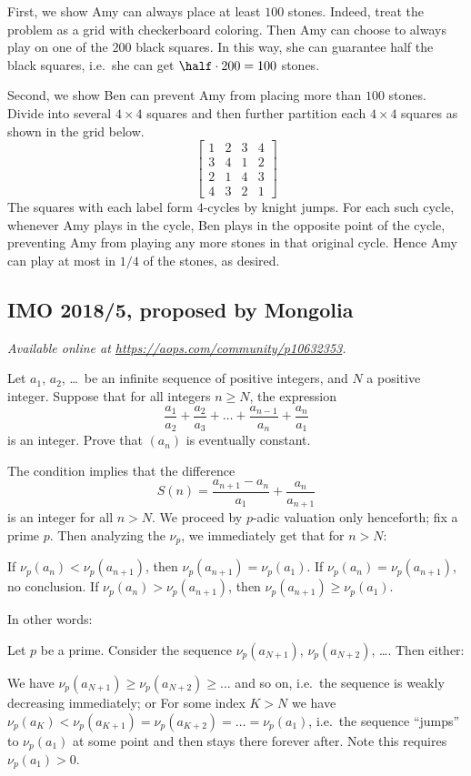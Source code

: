 \documentclass[11pt]{scrartcl}
\begin{document}
First, we show Amy can always place at least $100$ stones.
Indeed, treat the problem as a grid with checkerboard coloring.
Then Amy can choose to always play on one of the $200$ black squares.
In this way, she can guarantee half the black squares,
i.e.\ she can get $\half \cdot 200 = 100$ stones.

Second, we show Ben can prevent Amy from placing more than $100$ stones.
Divide into several $4 \times 4$ squares and then further partition
each $4 \times 4$ squares as shown in the grid below.
\[
  \left[
  \begin{array}{cccc}
    1 & 2 & 3 & 4 \\
    3 & 4 & 1 & 2 \\
    2 & 1 & 4 & 3 \\
    4 & 3 & 2 & 1
  \end{array}
  \right]
\]
The squares with each label form $4$-cycles by knight jumps.
For each such cycle, whenever Amy plays in the cycle,
Ben plays in the opposite point of the cycle,
preventing Amy from playing any more stones in that original cycle.
Hence Amy can play at most in $1/4$ of the stones, as desired.
\pagebreak

\subsection{IMO 2018/5, proposed by Mongolia}
\textsl{Available online at \url{https://aops.com/community/p10632353}.}
\begin{mdframed}[style=mdpurplebox,frametitle={Problem statement}]
Let $a_1$, $a_2$, \dots\ be an infinite sequence of positive integers,
and $N$ a positive integer.
Suppose that for all integers $n \ge N$, the expression
\[ \frac{a_1}{a_2} + \frac{a_2}{a_3} + \dots
  + \frac{a_{n-1}}{a_n} + \frac{a_n}{a_1} \]
is an integer.
Prove that $(a_n)$ is eventually constant.
\end{mdframed}
The condition implies that the difference
\[ S(n) = \frac{a_{n+1} - a_n}{a_1} + \frac{a_n}{a_{n+1}} \]
is an integer for all $n > N$.
We proceed by $p$-adic valuation only henceforth;
fix a prime $p$.
Then analyzing the $\nu_p$, we immediately get that for $n > N$:
\begin{itemize}
\ii If $\nu_p(a_n) < \nu_p(a_{n+1})$, then $\nu_p(a_{n+1}) = \nu_p(a_1)$.
\ii If $\nu_p(a_n) = \nu_p(a_{n+1})$, no conclusion.
\ii If $\nu_p(a_n) > \nu_p(a_{n+1})$,
then $\nu_p(a_{n+1}) \ge \nu_p(a_1)$.
\end{itemize}
In other words:
\begin{claim*}
Let $p$ be a prime.  Consider the sequence
$\nu_p(a_{N+1})$, $\nu_p(a_{N+2})$, \dots.
Then either:
\begin{itemize}
  \ii We have $\nu_p(a_{N+1}) \ge \nu_p(a_{N+2}) \ge \dots$
  and so on, i.e.\ the sequence is weakly decreasing immediately; or
  \ii For some index $K > N$ we have
  $\nu_p(a_K) < \nu_p(a_{K+1}) = \nu_p(a_{K+2}) = \dots = \nu_p(a_1)$,
  i.e.\ the sequence ``jumps'' to $\nu_p(a_1)$
  at some point and then stays there forever after.
  Note this requires $\nu_p(a_1) > 0$.
\end{itemize}
\end{claim*}
\end{document}
